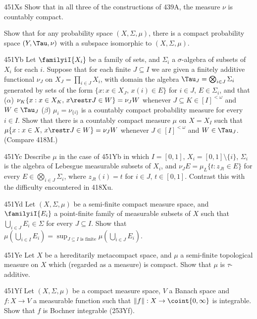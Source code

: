 {%
\spheader 451Xs Show that in all three of the constructions of 439A, the
measure $\nu$ is
countably compact.   

Show that for any probability space $(X,\Sigma,\mu)$, there is a compact
probability space $(Y,\Tau,\nu)$ with a subspace isomorphic to
$(X,\Sigma,\mu)$.

\spheader 451Yb
Let $\familyiI{X_i}$ be a family of sets, and $\Sigma_i$ a
$\sigma$-algebra of subsets of $X_i$ for each $i$.   Suppose that for
each finite $J\subseteq I$ we are given a finitely additive functional
$\nu_J$ on $X_J=\prod_{i\in J}X_i$, with domain the algebra
$\Tau_J=\bigotimes_{i\in J}\Sigma_i$
generated by sets of the form $\{x:x\in X_J,\,x(i)\in E\}$ for $i\in J$,
$E\in\Sigma_i$, and that ($\alpha$)
$\nu_K\{x:x\in X_K,\,x\restr J\in W\}=\nu_JW$ whenever
$J\subseteq K\in[I]^{<\omega}$ and $W\in\Tau_J$
($\beta$) $\mu_i=\nu_{\{i\}}$ is a countably compact probability measure
for every $i\in I$.   Show that there is a countably compact measure $\mu$
on $X=X_I$ such that $\mu\{x:x\in X,\,x\restr J\in W\}=\nu_JW$ whenever
$J\in[I]^{<\omega}$ and $W\in\Tau_J$.    (Compare 418M.)

\spheader 451Yc Describe $\mu$ in the case of 451Yb in which $I=[0,1]$,
$X_i=[0,1]\setminus\{i\}$, $\Sigma_i$ is the algebra of Lebesgue
measurable subsets of $X_i$, and $\nu_JE=\mu_L\{t:z_{Jt}\in E\}$ for
every $E\in\bigotimes_{i\in J}\Sigma_i$, where $z_{Jt}(i)=t$ for
$i\in J$, $t\in [0,1]$.   Contrast this with the difficulty encountered
in 418Xu.

\spheader 451Yd Let $(X,\Sigma,\mu)$ be a semi-finite compact measure
space, and $\familyiI{E_i}$ a point-finite family of measurable subsets
of $X$ such that $\bigcup_{i\in J}E_i\in\Sigma$ for every
$J\subseteq I$.   Show that $\mu(\bigcup_{i\in I}E_i)
=\sup_{J\subseteq I\text{ is finite}}\mu(\bigcup_{i\in J}E_i)$.

\spheader 451Ye Let $X$ be a
hereditarily metacompact space, and $\mu$ a semi-finite
topological measure on $X$ which (regarded as a measure) is compact.
Show that $\mu$ is $\tau$-additive.

\spheader 451Yf
Let $(X,\Sigma,\mu)$ be a compact measure space, $V$ a Banach space and
$f:X\to V$ a measurable function such that $\|f\|:X\to\coint{0,\infty}$
is integrable.   Show that $f$ is Bochner integrable (253Yf).

}
